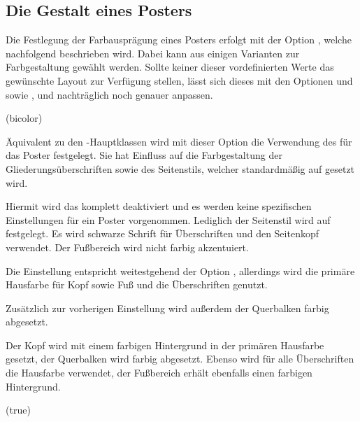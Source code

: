 \begin{DeclareEntity}{}
\subsection{Die Gestalt eines Posters}

Die Festlegung der Farbausprägung eines Posters erfolgt mit der Option 
, welche nachfolgend beschrieben wird. Dabei kann aus einigen 
Varianten zur Farbgestaltung gewählt werden. Sollte keiner dieser 
vordefinierten Werte das gewünschte Layout zur Verfügung stellen, lässt sich 
dieses mit den Optionen  und  sowie 
,  und  nachträglich 
noch genauer anpassen.


\begin{Declaration}
  {}
  (bicolor)

Äquivalent zu den \TUDScript-Hauptklassen wird mit dieser Option die Verwendung 
des \TUDCDs für das Poster festgelegt. Sie hat Einfluss auf die Farbgestaltung 
der Gliederungsüberschriften sowie des Seitenstils, welcher standardmäßig auf 
 gesetzt wird.
%
\begin{values}{}
\itemfalse
  Hiermit wird das \CD komplett deaktiviert und es werden keine spezifischen 
  Einstellungen für ein Poster vorgenommen. Lediglich der Seitenstil wird auf 
   festgelegt.
  Es wird schwarze Schrift für Überschriften und den Seitenkopf verwendet. Der 
  Fußbereich wird nicht farbig akzentuiert.
\item[lightcolor/pale]
  Die Einstellung entspricht weitestgehend der Option , 
  allerdings wird die primäre Hausfarbe  für Kopf sowie Fuß und 
  die Überschriften genutzt.
\item[barcolor]
  Zusätzlich zur vorherigen Einstellung wird außerdem der Querbalken farbig 
  abgesetzt.
\item[bicolor/color/fullcolor]
  Der Kopf wird mit einem farbigen Hintergrund in der primären Hausfarbe 
   gesetzt, der Querbalken wird farbig abgesetzt. Ebenso wird für 
  alle Überschriften die Hausfarbe verwendet, der Fußbereich erhält ebenfalls 
  einen farbigen Hintergrund.
\end{values}
\end{Declaration}

\begin{Declaration}
  {}
  (true)


\end{Declaration}
\end{DeclareEntity}
